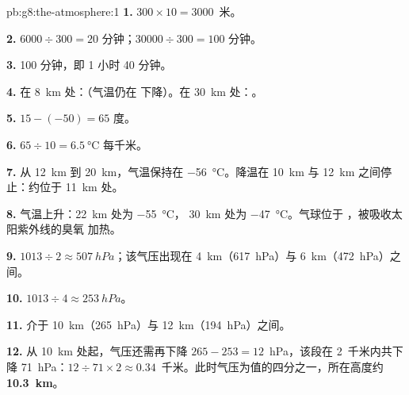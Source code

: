 \begin{solution}{pb:g8:the-atmosphere:1}
\textbf{1.} $300 \times 10 = 3000$~米。

\textbf{2.} $6000 \div 300 = 20$ 分钟；$\num{30000} \div 300 = 100$
分钟。

\textbf{3.} 100 分钟，即 1 小时 40 分钟。

\textbf{4.} 在 \qty{8}{km} 处：（气温仍在
下降）。在 \qty{30}{km} 处：。

\textbf{5.} $15 - (-50) = 65$ 度。

\textbf{6.} $65 \div 10 = \qty{6.5}{\degreeCelsius}$ 每千米。

\textbf{7.} 从 \qty{12}{km} 到 \qty{20}{km}，气温保持在
\qty{-56}{\degreeCelsius}。降温在 \qty{10}{km} 与
\qty{12}{km} 之间停止：约位于 \qty{11}{km} 处。

\textbf{8.} 气温上升：\qty{22}{km} 处为 \qty{-55}{\degreeCelsius}，
\qty{30}{km} 处为 \qty{-47}{\degreeCelsius}。气球位于
，被吸收太阳紫外线的臭氧
加热。

\textbf{9.} $1013 \div 2 \approx \qty{507}{hPa}$；该气压出现在
\qty{4}{km}（\qty{617}{hPa}）与 \qty{6}{km}（\qty{472}{hPa}）之间。

\textbf{10.} $1013 \div 4 \approx \qty{253}{hPa}$。

\textbf{11.} 介于 \qty{10}{km}（\qty{265}{hPa}）与
\qty{12}{km}（\qty{194}{hPa}）之间。

\textbf{12.} 从 \qty{10}{km} 处起，气压还需再下降 $265 - 253 =
12$~hPa，该段在 2~千米内共下降 71~hPa：$12 \div 71 \times 2
\approx 0.34$~千米。此时气压为值的四分之一，所在高度约
\textbf{\qty{10.3}{km}}。
\end{solution}
